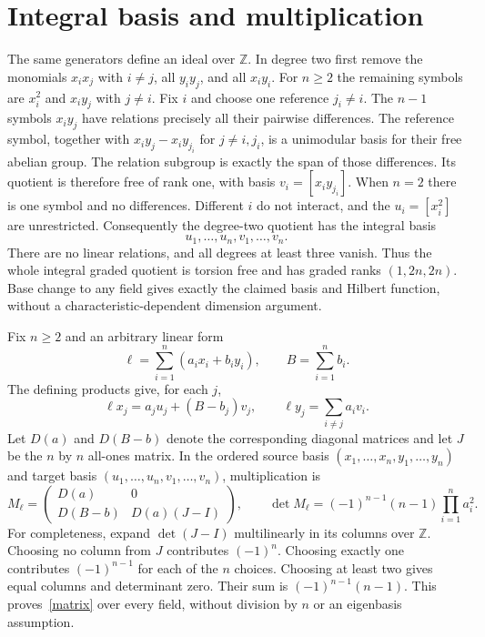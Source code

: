 \documentclass[11pt]{article}
\theoremstyle{definition}
\begin{document}
\section{Integral basis and multiplication}
The same generators define an ideal over $\mathbb Z$. In degree two first
remove the monomials $x_ix_j$ with $i\ne j$, all $y_iy_j$, and all $x_iy_i$.
For $n\geq2$ the remaining symbols are $x_i^2$ and $x_iy_j$ with $j\ne i$.
Fix $i$ and choose one reference $j_i\ne i$. The $n-1$ symbols
$x_iy_j$ have relations precisely all their pairwise differences.
The reference symbol, together with
$x_iy_j-x_iy_{j_i}$ for $j\ne i,j_i$, is a unimodular basis for their
free abelian group. The relation subgroup is exactly the span of those
differences. Its quotient is therefore free of rank one, with basis
$v_i=[x_iy_{j_i}]$. When $n=2$ there is one symbol and no differences.
Different $i$ do not interact, and the $u_i=[x_i^2]$ are unrestricted.
Consequently the degree-two quotient has the integral basis
\[
 u_1,\ldots,u_n,v_1,\ldots,v_n.
\]
There are no linear relations, and all degrees at least three vanish.
Thus the whole integral graded quotient is torsion free and has graded
ranks $(1,2n,2n)$. Base change to any field gives exactly the claimed
basis and Hilbert function, without a characteristic-dependent dimension
argument.

Fix $n\geq2$ and an arbitrary linear form
\[
 \ell=\sum_{i=1}^n(a_ix_i+b_iy_i),\qquad B=\sum_{i=1}^n b_i.
\]
The defining products give, for each $j$,
\[
 \ell x_j=a_j u_j+(B-b_j)v_j,\qquad
 \ell y_j=\sum_{i\ne j}a_i v_i.
\]
Let $D(a)$ and $D(B-b)$ denote the corresponding diagonal matrices and
let $J$ be the $n$ by $n$ all-ones matrix. In the ordered source basis
$(x_1,\ldots,x_n,y_1,\ldots,y_n)$ and target basis $(u_1,\ldots,u_n,
v_1,\ldots,v_n)$, multiplication is
\begin{equation}\label{matrix}
 M_\ell=
 \begin{pmatrix}
 D(a)&0\\
 D(B-b)&D(a)(J-I)
 \end{pmatrix},\qquad
 \det M_\ell=(-1)^{n-1}(n-1)\prod_{i=1}^n a_i^2 .
\end{equation}
For completeness, expand $\det(J-I)$ multilinearly in its columns over
$\mathbb Z$. Choosing no column from $J$ contributes $(-1)^n$.
Choosing exactly one contributes $(-1)^{n-1}$ for each of the $n$ choices.
Choosing at least two gives equal columns and determinant zero.
Their sum is $(-1)^{n-1}(n-1)$. This proves~\eqref{matrix}
over every field, without division by $n$ or an eigenbasis assumption.
\end{document}
